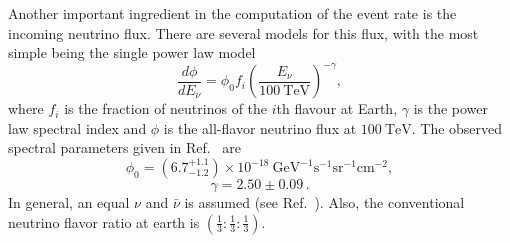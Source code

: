 \documentclass[aps,preprint,tightenlines,floatfix,superscriptaddress,nofootinbib,showpacs]{revtex4-1}
\def\beq{\begin{equation}}
\def\eeq{\end{equation}}
\begin{document}
\par
Another important ingredient in the computation of the event rate is the incoming neutrino flux. There are several models for this flux, with the most simple being the single power law model 
\beq
\label{eq139}
\frac{d\phi}{dE_{\nu}}= \phi_0f_i \left(\frac{E_{\nu}}{100~\mathrm{TeV}}\right)^{-\gamma},
\eeq
where $f_i$ is the fraction of neutrinos of the $i$th flavour at Earth, $\gamma$ is the power law spectral index and $\phi$ is the all-flavor neutrino flux at $100~\mathrm{TeV}$. The observed spectral parameters given in Ref.~\cite{icecubeLL} are 
\beq
\label{eq139}
\phi_0 = (6.7^{+1.1}_{-1.2})\times 10^{-18}~\mathrm{GeV}^{-1}\mathrm{s}^{-1}\mathrm{sr}^{-1}\mathrm{cm}^{-2},
\eeq
\beq
\label{eq140}
\gamma = 2.50 \pm 0.09 \,.
\eeq
In general, an equal $\nu$ and $\bar{\nu}$ is assumed (see Ref.~\cite{icecube1}). Also, the conventional neutrino flavor ratio at earth is $(\frac{1}{3}:\frac{1}{3}:\frac{1}{3})$.
\newpage
\appendix
\end{document}
